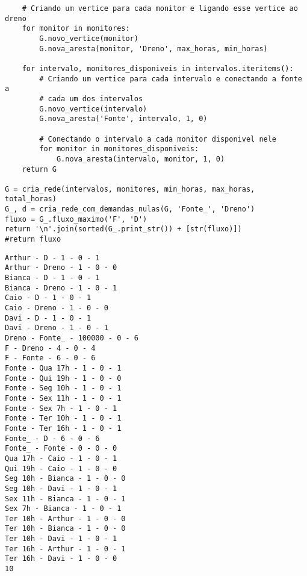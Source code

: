 \documentclass[11pt]{article}
\begin{document}
\begin{verbatim}
    # Criando um vertice para cada monitor e ligando esse vertice ao dreno
    for monitor in monitores:
        G.novo_vertice(monitor)
        G.nova_aresta(monitor, 'Dreno', max_horas, min_horas)

    for intervalo, monitores_disponiveis in intervalos.iteritems():
        # Criando um vertice para cada intervalo e conectando a fonte a
        # cada um dos intervalos
        G.novo_vertice(intervalo)
        G.nova_aresta('Fonte', intervalo, 1, 0)

        # Conectando o intervalo a cada monitor disponivel nele
        for monitor in monitores_disponiveis:
            G.nova_aresta(intervalo, monitor, 1, 0)
    return G

G = cria_rede(intervalos, monitores, min_horas, max_horas, total_horas)
G_, d = cria_rede_com_demandas_nulas(G, 'Fonte_', 'Dreno')
fluxo = G_.fluxo_maximo('F', 'D')
return '\n'.join(sorted(G_.print_str()) + [str(fluxo)])
#return fluxo
\end{verbatim}

\begin{verbatim}
Arthur - D - 1 - 0 - 1
Arthur - Dreno - 1 - 0 - 0
Bianca - D - 1 - 0 - 1
Bianca - Dreno - 1 - 0 - 1
Caio - D - 1 - 0 - 1
Caio - Dreno - 1 - 0 - 0
Davi - D - 1 - 0 - 1
Davi - Dreno - 1 - 0 - 1
Dreno - Fonte_ - 100000 - 0 - 6
F - Dreno - 4 - 0 - 4
F - Fonte - 6 - 0 - 6
Fonte - Qua 17h - 1 - 0 - 1
Fonte - Qui 19h - 1 - 0 - 0
Fonte - Seg 10h - 1 - 0 - 1
Fonte - Sex 11h - 1 - 0 - 1
Fonte - Sex 7h - 1 - 0 - 1
Fonte - Ter 10h - 1 - 0 - 1
Fonte - Ter 16h - 1 - 0 - 1
Fonte_ - D - 6 - 0 - 6
Fonte_ - Fonte - 0 - 0 - 0
Qua 17h - Caio - 1 - 0 - 1
Qui 19h - Caio - 1 - 0 - 0
Seg 10h - Bianca - 1 - 0 - 0
Seg 10h - Davi - 1 - 0 - 1
Sex 11h - Bianca - 1 - 0 - 1
Sex 7h - Bianca - 1 - 0 - 1
Ter 10h - Arthur - 1 - 0 - 0
Ter 10h - Bianca - 1 - 0 - 0
Ter 10h - Davi - 1 - 0 - 1
Ter 16h - Arthur - 1 - 0 - 1
Ter 16h - Davi - 1 - 0 - 0
10
\end{verbatim}
\end{document}
